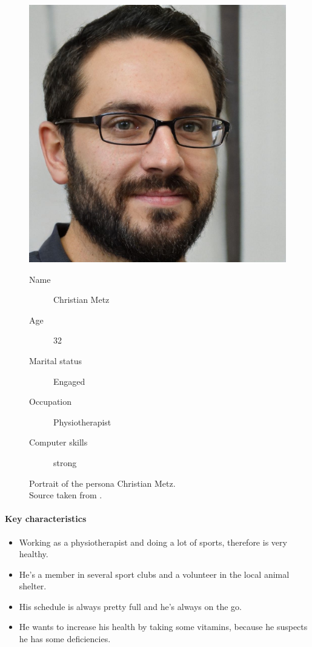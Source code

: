 \documentclass[conference]{IEEEtran}
\begin{document}
\begin{figure}[H]
	\centering
	\begin{minipage}{0.4\linewidth}
		\centerline{\includegraphics[width=\linewidth]{images/persona02.jpg}}
		\caption[Portrait of the persona Christian Metz; Source taken from \cite{personaimg}.]
		{Portrait of the persona Christian Metz.\\ Source taken from \cite{personaimg}.\endtabular}
		\label{fig:persona2}
	\end{minipage}
	\hfill
	\begin{minipage}{0.5\linewidth}
		\vspace{-25pt}
		\begin{description}
			\item[Name] Christian Metz
			\item[Age] 32
			\item[Marital status] Engaged
			\item[Occupation] Physiotherapist
			\item[Computer skills] strong
		\end{description}
	\end{minipage}
\end{figure}

\paragraph*{Key characteristics}
\begin{itemize}[leftmargin=1.25cm]
	\item Working as a physiotherapist and doing a lot of sports, therefore is very healthy.
	\item He's a member in several sport clubs and a volunteer in the local animal shelter.
	\item His schedule is always pretty full and he's always on the go.
	\item He wants to increase his health by taking some vitamins, because he suspects he has some deficiencies.
\end{itemize}
\end{document}
